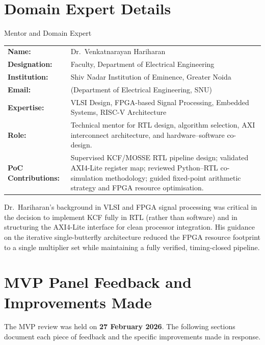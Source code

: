 \documentclass[12pt,a4paper]{article}
\begin{document}
\section{Domain Expert Details}

\begin{reportbox}{Mentor and Domain Expert}
\renewcommand{\arraystretch}{1.35}
\begin{tabular}{L{4cm} L{9.8cm}}
\textbf{Name:}        & Dr.\ Venkatnarayan Hariharan \\
\textbf{Designation:} & Faculty, Department of Electrical Engineering \\
\textbf{Institution:} & Shiv Nadar Institution of Eminence, Greater Noida \\
\textbf{Email:}       & (Department of Electrical Engineering, SNU) \\
\textbf{Expertise:}   & VLSI Design, FPGA-based Signal Processing, Embedded Systems, RISC-V Architecture \\
\textbf{Role:}        & Technical mentor for RTL design, algorithm selection, AXI interconnect architecture, and hardware--software co-design. \\
\textbf{PoC Contributions:} & Supervised KCF/MOSSE RTL pipeline design; validated AXI4-Lite register map; reviewed Python--RTL co-simulation methodology; guided fixed-point arithmetic strategy and FPGA resource optimisation. \\
\end{tabular}
\end{reportbox}

Dr.\ Hariharan's background in VLSI and FPGA signal processing was critical in the decision to implement KCF fully in RTL (rather than software) and in structuring the AXI4-Lite interface for clean processor integration. His guidance on the iterative single-butterfly architecture reduced the FPGA resource footprint to a single multiplier set while maintaining a fully verified, timing-closed pipeline.

\section{MVP Panel Feedback and Improvements Made}
\label{sec:feedback}

The MVP review was held on \textbf{27 February 2026}. The following sections document each piece of feedback and the specific improvements made in response.
\end{document}
